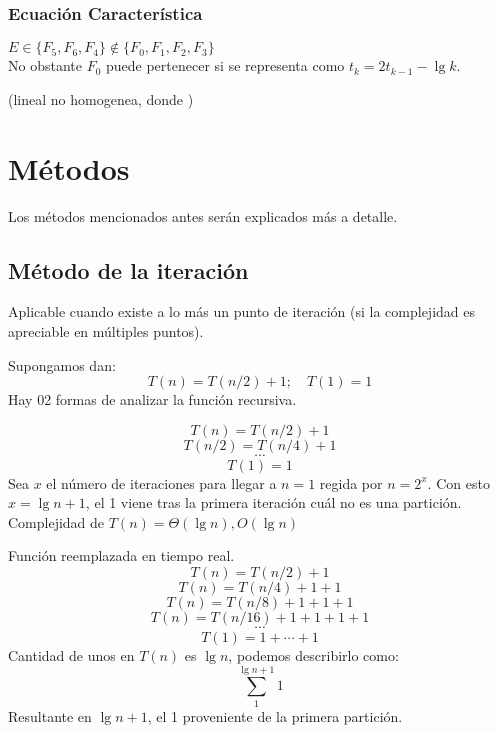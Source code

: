 \documentclass[tikz,11pt,fleqn]{book} %
\begin{document}
\subsubsection{Ecuación Característica}
\(  E\in\{F_5, F_6, F_4\}\not\in\{F_0, F_1, F_2, F_3\} \)\\
No obstante $F_0$ puede pertenecer si se representa como $t_k=2t_{k-1}-\lg k$.

(lineal no homogenea, donde )

\section{Métodos}
Los métodos mencionados antes serán explicados más a detalle.

\subsection{Método de la iteración}
Aplicable cuando existe a lo más un punto de iteración (si la complejidad es apreciable en múltiples puntos).

\begin{example}
	Supongamos dan:
	$$T(n)=T(n/2)+1;\quad T(1)=1$$
	Hay 02 formas de analizar la función recursiva.
	\begin{definition}
		$$T(n)=T(n/2)+1$$
		$$T(n/2)=T(n/4)+1$$
		$$\cdots$$
		$$T(1)=1$$
		Sea $x$ el número de iteraciones para llegar a $n=1$ regida por $n=2^x$.
		Con esto $x=\lg n +1$, el 1 viene tras la primera iteración cuál no es una partición.
		Complejidad de $T(n)=\Theta(\lg n), O(\lg n)$
	\end{definition}
	\begin{definition}
		Función reemplazada en tiempo real.
		$$ T(n)=T(n/2)+1 $$
		$$ T(n)=T(n/4)+1+1 $$
		$$ T(n)=T(n/8)+1+1+1 $$
		$$ T(n)=T(n/16)+1+1+1+1 $$
		$$ \cdots $$
		$$ T(1)=1+\cdots+1 $$
		Cantidad de unos en $T(n)$ es $\lg n$, podemos describirlo como:
		$$  \sum_1^{\lg n+1} 1  $$
		Resultante en $\lg n+1$, el 1 proveniente de la primera partición.
	\end{definition}
\end{example}
\end{document}
